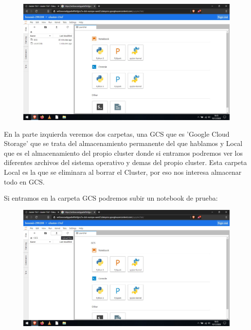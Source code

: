 \documentclass[a4paper,10pt]{article}
\begin{document}
\begin{figure}[H]
\begin{center}
\includegraphics[width=500pt]{./fotos/GoogleCloud/38 - GC.jpg}
\end{center}
\end{figure}

En la parte izquierda veremos dos carpetas, una GCS que es 'Google Cloud Storage' que se trata del almacenamiento permanente del que hablamos y Local que es el almacenamiento del propio cluster donde si entramos podremos ver los diferentes archivos del sistema operativo y demas del propio cluster. Esta carpeta Local es la que se eliminara al borrar el Cluster, por eso nos interesa almacenar todo en GCS.

Si entramos en la carpeta GCS podremos subir un notebook de prueba:

\begin{figure}[H]
\begin{center}
\includegraphics[width=500pt]{./fotos/GoogleCloud/39 - GC.jpg}
\end{center}
\end{figure}
\end{document}

